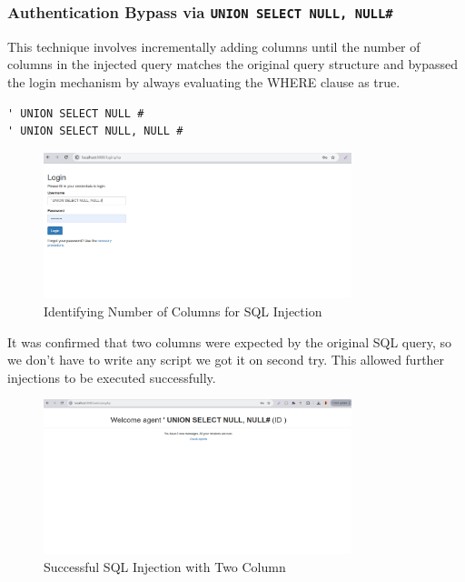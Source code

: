 \documentclass[12pt]{article}
\begin{document}
\subsubsection{Authentication Bypass via \texttt{UNION SELECT NULL, NULL\#}}
This technique involves incrementally adding columns until the number of columns in the injected query matches the original query structure\cite{mariadb-union} and bypassed the login mechanism by always evaluating the WHERE clause as true.

\begin{verbatim}
' UNION SELECT NULL #
' UNION SELECT NULL, NULL #
\end{verbatim}

\begin{figure}[h!]
\centering
\includegraphics[width=0.8\textwidth]{PT3.png}
\caption{Identifying Number of Columns for SQL Injection }
\label{fig:sql_injection}
\end{figure}

\FloatBarrier
It was confirmed that two columns were expected by the original SQL query, so we don't have to write any script we got it on second try. This allowed further injections to be executed successfully.

\begin{figure}[h!]
\centering
\includegraphics[width=0.8\textwidth]{PT4.png}
\caption{Successful SQL Injection with Two Column}
\label{fig:sql_injection}
\end{figure}
\FloatBarrier
\end{document}
